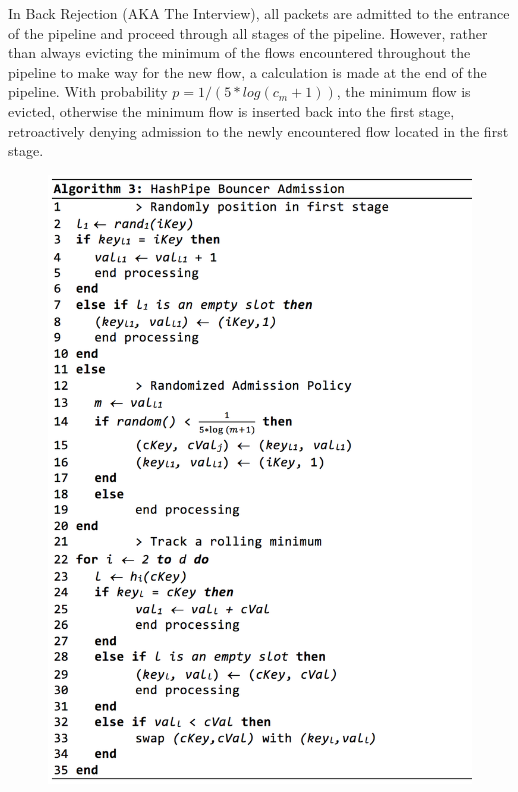 In Back Rejection (AKA The Interview), all packets are admitted to the entrance of the pipeline and proceed through all stages of the pipeline. However, rather than always evicting the minimum of the flows encountered throughout the pipeline to make way for the new flow, a calculation is made at the end of the pipeline. With probability $p = 1 / (5*log(c_m + 1))$, the minimum flow is evicted, otherwise the minimum flow is inserted back into the first stage, retroactively denying admission to the newly encountered flow located in the first stage. 
\begin{figure}[t]
  \centering
    \includegraphics[scale=0.42]{alg3}
     \label{fig:bp-image}
\end{figure}